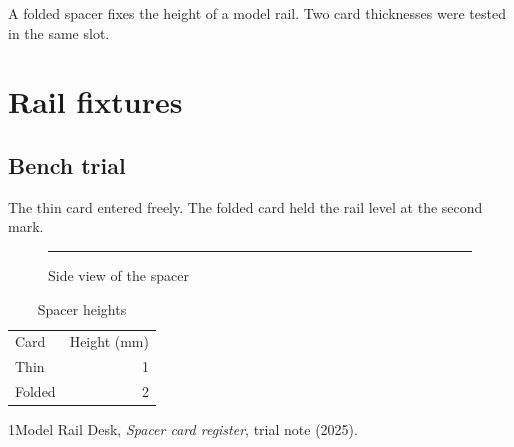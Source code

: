 \documentclass[oneside]{scrreprt}
\begin{document}
A folded spacer fixes the height of a model rail. Two card thicknesses were tested in the same slot.\chapter{Rail fixtures}
\section{Bench trial}
The thin card entered freely. The folded card held the rail level at the second mark.
\begin{figure}[ht]\centering\rule{28mm}{2mm}\caption{Side view of the spacer}\end{figure}
\begin{table}[ht]\centering\begin{tabular}{lr}Card&Height (mm)\\Thin&1\\Folded&2\end{tabular}\caption{Spacer heights}\end{table}
\begin{thebibliography}{1}Model Rail Desk, \emph{Spacer card register}, trial note (2025).\end{thebibliography}
\end{document}
